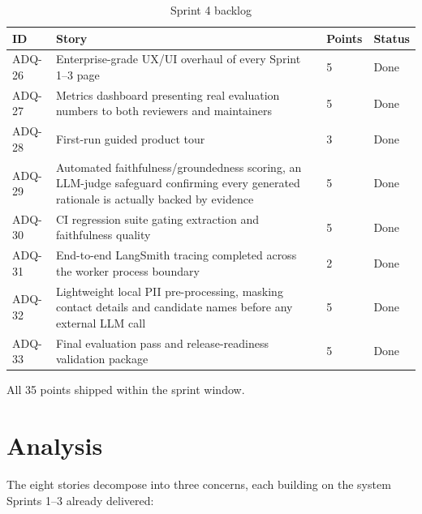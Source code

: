 \begin{table}[H]
  \centering
  \caption{Sprint 4 backlog}
  \label{tab:sprint4-backlog}
  \begin{tabular}{@{}p{1.7cm}p{11.2cm}p{1.3cm}p{2.7cm}@{}}
    \toprule
    ID & Story & Points & Status \\
    \midrule
    ADQ-26 & Enterprise-grade UX/UI overhaul of every Sprint 1--3 page & 5 & Done \\
    ADQ-27 & Metrics dashboard presenting real evaluation numbers to both reviewers and maintainers & 5 & Done \\
    ADQ-28 & First-run guided product tour & 3 & Done \\
    ADQ-29 & Automated faithfulness/groundedness scoring, an LLM-judge safeguard confirming every generated rationale is actually backed by evidence & 5 & Done \\
    ADQ-30 & CI regression suite gating extraction and faithfulness quality & 5 & Done \\
    ADQ-31 & End-to-end LangSmith tracing completed across the worker process boundary & 2 & Done \\
    ADQ-32 & Lightweight local PII pre-processing, masking contact details and candidate names before any external LLM call & 5 & Done \\
    ADQ-33 & Final evaluation pass and release-readiness validation package & 5 & Done \\
    \bottomrule
  \end{tabular}
\end{table}

All 35 points shipped within the sprint window.

\section{Analysis}

The eight stories decompose into three concerns, each building on the
system Sprints 1--3 already delivered:

